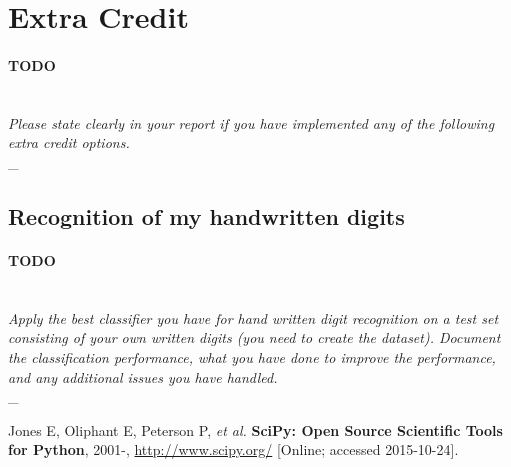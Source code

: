 \documentclass{article}
\numberwithin{figure}{section}
\newcommand{\outline}[2]{\paragraph{\textsc{#1}}\hrulefill~\\{\small\it #2}\\\_\hrulefill}
\newcommand{\todo}[1]{\outline{\large TODO}{#1}}
\begin{document}
\section{Extra Credit}
\todo{Please state clearly in your report if you have implemented any of the following extra
credit options.}

\subsection{Recognition of my handwritten digits}
\todo{Apply the best classifier you have for hand written digit recognition on a test set consisting of your own written digits (you need to create the dataset). Document the classification performance, what you have done to improve the performance, and any additional issues you have handled.}


\begin{thebibliography}{9}

    Jones E, Oliphant E, Peterson P, \emph{et al.}
    {\bf SciPy: Open Source Scientific Tools for Python}, 2001-,
    \url{http://www.scipy.org/} [Online; accessed 2015-10-24].

\end{thebibliography}

\end{document}
